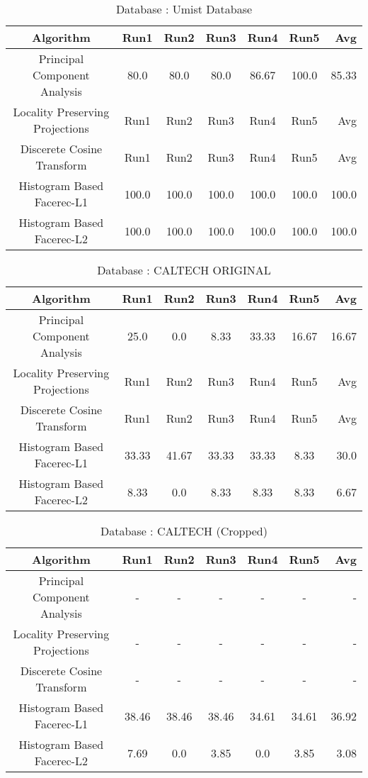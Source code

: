 \documentclass[10pt,a4paper]{article}
\begin{document}
\begin{center}
\begin{table}
\begin{tabular}{| c | c | c | c | c | c | r | }
\end{tabular}
\end{table}

\begin{table}
\caption{Database : Umist Database }
\centering
\begin{tabular}{| c | c | c | c | c | c | r | } \hline 
Algorithm & Run1 & Run2 & Run3 & Run4 & Run5 & Avg  \\  
\hline
Principal Component Analysis & 80.0 & 80.0 & 80.0 & 86.67 & 100.0 & 85.33 \\
\hline
Locality Preserving Projections & Run1 & Run2 & Run3 & Run4 & Run5 & Avg \\
\hline
Discerete Cosine Transform & Run1 & Run2 & Run3 & Run4 & Run5 & Avg \\
\hline
Histogram Based Facerec-L1 & 100.0 & 100.0 & 100.0 & 100.0 & 100.0 & 100.0 \\
\hline
Histogram Based Facerec-L2 & 100.0 & 100.0 & 100.0 & 100.0 & 100.0 & 100.0 \\
\hline

\end{tabular}
\end{table}


\begin{table}
\caption{Database : CALTECH ORIGINAL}
\centering
\begin{tabular}{| c | c | c | c | c | c | r | } \hline 
Algorithm & Run1 & Run2 & Run3 & Run4 & Run5 & Avg  \\  
\hline
Principal Component Analysis & 25.0 & 0.0 & 8.33 & 33.33 & 16.67 & 16.67 \\
\hline
Locality Preserving Projections & Run1 & Run2 & Run3 & Run4 & Run5 & Avg \\
\hline
Discerete Cosine Transform & Run1 & Run2 & Run3 & Run4 & Run5 & Avg \\
\hline
Histogram Based Facerec-L1 & 33.33 & 41.67 & 33.33 & 33.33 & 8.33 & 30.0 \\
\hline
Histogram Based Facerec-L2 & 8.33 & 0.0 & 8.33 & 8.33 & 8.33 & 6.67 \\
\hline

\end{tabular}
\end{table}

\begin{table}
\caption{Database : CALTECH (Cropped) }
\centering
\begin{tabular}{| c | c | c | c | c | c | r | } \hline 
Algorithm & Run1 & Run2 & Run3 & Run4 & Run5 & Avg  \\  
\hline
Principal Component Analysis & - & - & - & - & - & - \\
\hline
Locality Preserving Projections & - & - & - & - & - & - \\
\hline
Discerete Cosine Transform & - & - & - & - & - & - \\
\hline
Histogram Based Facerec-L1 & 38.46 & 38.46 & 38.46 & 34.61 & 34.61 & 36.92 \\
\hline
Histogram Based Facerec-L2 & 7.69 & 0.0 & 3.85 & 0.0 & 3.85 & 3.08 \\
\hline


\end{tabular}
\end{table}
\end{center}
\end{document}
